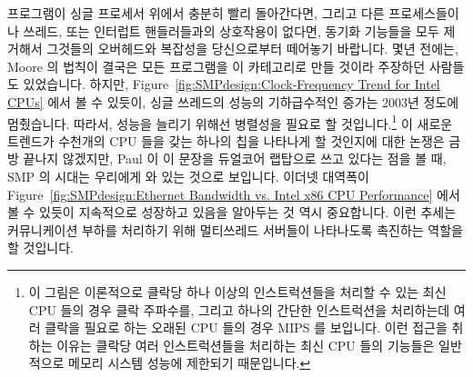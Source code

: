 프로그램이 싱글 프로세서 위에서 충분히 빨리 돌아간다면, 그리고 다른
프로세스들이나 쓰레드, 또는 인터럽트 핸들러들과의 상호작용이 없다면, 동기화
기능들을 모두 제거해서 그것들의 오버헤드와 복잡성을 당신으로부터 떼어놓기
바랍니다.
몇년 전에는, Moore 의 법칙이 결국은 모든 프로그램을 이 카테고리로 만들 것이라
주장하던 사람들도 있었습니다.
하지만,
Figure~\ref{fig:SMPdesign:Clock-Frequency Trend for Intel CPUs} 에서 볼 수
있듯이, 싱글 쓰레드의 성능의 기하급수적인 증가는 2003년 정도에 멈췄습니다.
따라서, 성능을 늘리기 위해선 병렬성을 필요로 할 것입니다.\footnote{
	이 그림은 이론적으로 클락당 하나 이상의 인스트럭션들을 처리할 수 있는
	최신 CPU 들의 경우 클락 주파수를, 그리고 하나의 간단한 인스트럭션을
	처리하는데 여러 클락을 필요로 하는 오래된 CPU 들의 경우 MIPS 를
	보입니다.
	이런 접근을 취하는 이유는 클락당 여러 인스트럭션들을 처리하는 최신 CPU
	들의 기능들은 일반적으로 메모리 시스템 성능에 제한되기 때문입니다.}
이 새로운 트렌드가 수천개의 CPU 들을 갖는 하나의 칩을 나타나게 할 것인지에 대한
논쟁은 금방 끝나지 않겠지만, Paul 이 이 문장을 듀얼코어 랩탑으로 쓰고 있다는
점을 볼 때, SMP 의 시대는 우리에게 와 있는 것으로 보입니다.
이더넷 대역폭이
Figure~\ref{fig:SMPdesign:Ethernet Bandwidth vs. Intel x86 CPU Performance}
에서 볼 수 있듯이 지속적으로 성장하고 있음을 알아두는 것 역시 중요합니다.
이런 추세는 커뮤니케이션 부하를 처리하기 위해 멀티쓰레드 서버들이 나타나도록
촉진하는 역할을 할 것입니다.

